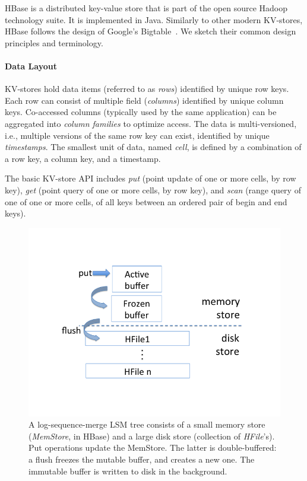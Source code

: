 
HBase is a distributed key-value store that is part of the open source Hadoop technology suite. 
It is implemented in Java. Similarly to other modern KV-stores, HBase follows the design of 
Google's Bigtable~\cite{Chang2008}. We sketch their common design principles 
and terminology. 

\paragraph{Data Layout}
KV-stores hold data items (referred to as \emph{rows}) identified by unique 
row keys. Each row can consist of multiple field (\emph{columns}) identified by unique 
column keys. Co-accessed columns (typically used by the same application) can be 
aggregated into  \emph{column families} to optimize access. The data is multi-versioned, 
i.e., multiple versions of the same row key can exist, identified by unique {\em timestamps}. 
The smallest unit of data, named {\em cell}, is defined by a combination of a row key, a
column key, and a timestamp.

The basic KV-store API includes \emph{put} (point update of one or more cells, by row key), 
\emph{get} (point query of one or more cells, by row key), and \emph{scan} (range query of one 
 of one or more cells, of all keys between an ordered pair of begin and end keys). 

\begin{figure}[tb]
\center
\includegraphics[width=\columnwidth, trim={0 2cm 0 2cm}, clip]{LSM} 
\caption{A log-sequence-merge LSM tree consists of a small memory store ({\em MemStore}, in HBase) 
and a large disk store (collection of {\em HFile}'s). Put operations update the MemStore. The latter is 
double-buffered: a flush freezes the mutable buffer, and creates a new one. 
The immutable buffer is written to disk in the background.}
\label{fig:LSM}
\end{figure}

